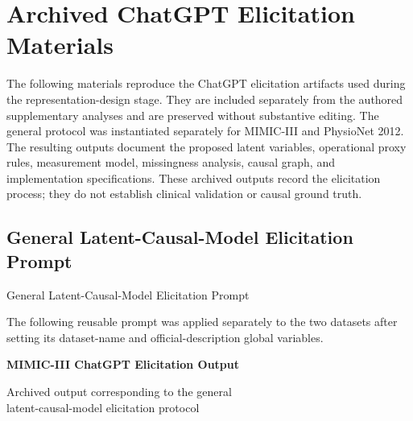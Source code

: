 \documentclass[letterpaper,10pt]{article}
\begin{document}
\clearpage
\appendix

\section*{Archived ChatGPT Elicitation Materials}

The following materials reproduce the ChatGPT elicitation artifacts used during
the representation-design stage. They are included separately from the authored
supplementary analyses and are preserved without substantive editing. The
general protocol was instantiated separately for MIMIC-III and PhysioNet 2012.
The resulting outputs document the proposed latent variables, operational proxy
rules, measurement model, missingness analysis, causal graph, and implementation
specifications. These archived outputs record the elicitation process; they do
not establish clinical validation or causal ground truth.

\subsection*{General Latent-Causal-Model Elicitation Prompt}
  {General Latent-Causal-Model Elicitation Prompt}

The following reusable prompt was applied separately to the two datasets after
setting its dataset-name and official-description global variables.

\begingroup
\scriptsize
{}
\endgroup



\clearpage
\thispagestyle{empty}

\begin{center}
    {\LARGE\bfseries MIMIC-III ChatGPT Elicitation Output}

    \vspace{1em}

    {\large Archived output corresponding to the general\\
    latent-causal-model elicitation protocol}
\end{center}

\vspace{2em}
\end{document}
